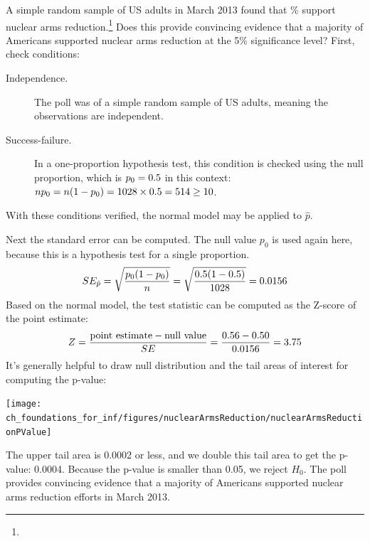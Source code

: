 \begin{example}{A simple random sample of
    \gallupnucleararmspollsize{} US adults
    in March 2013 found that
    \gallupnucleararmspollpercent{}\% support nuclear arms
    reduction.\footnote{}
    Does this provide convincing evidence that a majority
    of Americans supported nuclear arms reduction at the
    5\% significance level?} \label{NuclearArmsInferenceExample}
  First, check conditions:
  \begin{description}
  \item[Independence.] The poll was of a simple random sample
      of US adults, meaning the observations are independent.
  \item[Success-failure.] In a one-proportion hypothesis test,
      this condition is checked using the null proportion,
      which is $p_0 = 0.5{}$
      in this context:
      $n p_0 = n (1 - p_0)
          = 1028{} \times
              0.5{}
          = 514{} \geq 10$.
  \end{description}
  With these conditions verified,
  the normal model may be applied to $\hat{p}$.

  Next the standard error can be computed.
  The null value $p_0$ is used again here,
  because this is a hypothesis test for a single proportion.
  \begin{align*}
  SE_{\hat{p}}
      = \sqrt{\frac{p_0 (1 - p_0)}{n}}
      = \sqrt{\frac{0.5{}
          (1 - 0.5{})}
          {1028{}}}
      = 0.0156{}
  \end{align*}
  Based on the normal model, the test statistic can be
  computed as the Z-score of the point estimate:
  \begin{align*}
  Z = \frac{\text{point estimate} - \text{null value}}{SE}
      = \frac{0.56{} - 0.50}
          {0.0156{}}
      = 3.75
  \end{align*}
  It's generally helpful to draw null distribution and
  the tail areas of interest for computing the p-value:
  \begin{center}
  \texttt{[image: ch\_foundations\_for\_inf/figures/nuclearArmsReduction/nuclearArmsReductionPValue]}
  \end{center}
  The upper tail area is 0.0002 or less,
  and we double this tail area to get the p-value: 0.0004.
  Because the p-value is smaller than 0.05, we reject $H_0$.
  The poll provides convincing evidence that a majority
  of Americans supported nuclear arms reduction efforts
  in March 2013.
\end{example}

